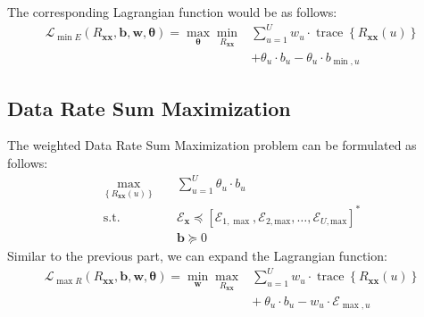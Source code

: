 The corresponding Lagrangian function would be as follows:
\begin{equation}
\begin{aligned}
\mathcal{L}_{\min E}\left(R_{\boldsymbol{x} \boldsymbol{x}}, \boldsymbol{b}, \boldsymbol{w}, \boldsymbol{\theta}\right)=\max _{\boldsymbol{\theta}} \min _{R_{\boldsymbol{x} \boldsymbol{x}}} &\sum_{u=1}^U  w_u \cdot \operatorname{trace}\left\{R_{\boldsymbol{x} \boldsymbol{x}}(u)\right\}\\ &+ \theta_u \cdot b_u-\theta_u \cdot b_{\min , u}
\end{aligned}
\end{equation}
\subsection{Data Rate Sum Maximization} \label{Rsum}
The weighted Data Rate Sum Maximization problem can be formulated as follows:
\begin{equation}
\begin{aligned}
\max _{\left\{R_{\boldsymbol{x} \boldsymbol{x}}{(u)}\right\}} \quad &\sum_{u=1}^U \theta_u \cdot b_u \\
\textrm{s.t.} \quad &\mathcal{E}_{\boldsymbol{x}} \preceq\left[\mathcal{E}_{1,\max}, \mathcal{E}_{2,\text{max}},\ldots,\mathcal{E}_{U,\text{max}}\right]^*\\
& \mathbf{b} \succeq 0
\end{aligned}
\end{equation}
Similar to the previous part, we can expand the Lagrangian function:
\begin{equation}
\begin{aligned}
\mathcal{L}_{\max R}\left(R_{\boldsymbol{x} \boldsymbol{x}}, \boldsymbol{b}, \boldsymbol{w}, \boldsymbol{\theta}\right)=\min _{\boldsymbol{w}} \max _{R_{\boldsymbol{x} \boldsymbol{x}}} &\sum_{u=1}^U w_u \cdot \operatorname{trace}\left\{R_{\boldsymbol{x} \boldsymbol{x}}(u)\right\}\\ &+\:\theta_u \cdot b_u-w_u \cdot \mathcal{E}_{\max , u}
\end{aligned}
\end{equation} 


